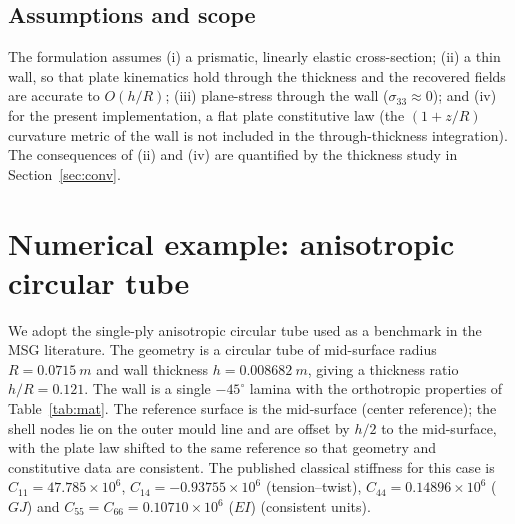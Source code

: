 \documentclass[preprint,12pt]{elsarticle}
\newcommand{\hR}{h/R}
\begin{document}
\subsection{Assumptions and scope}
The formulation assumes (i) a prismatic, linearly elastic cross-section;
(ii) a thin wall, so that plate kinematics hold through the thickness and the
recovered fields are accurate to $O(\hR)$; (iii) plane-stress through the wall
($\sigma_{33}\!\approx\!0$); and (iv) for the present implementation, a flat
plate constitutive law (the $(1+z/R)$ curvature metric of the wall is not
included in the through-thickness integration). The consequences of (ii) and
(iv) are quantified by the thickness study in Section~\ref{sec:conv}.

\section{Numerical example: anisotropic circular tube}
We adopt the single-ply anisotropic circular tube used as a benchmark in the
MSG literature. The geometry is a circular tube of mid-surface radius
$R=\SI{0.0715}{m}$ and wall thickness $h=\SI{0.008682}{m}$, giving a thickness
ratio $\hR=0.121$. The wall is a single $-45^{\circ}$ lamina with the
orthotropic properties of Table~\ref{tab:mat}. The reference surface is the
mid-surface (center reference); the shell nodes lie on the outer mould line and
are offset by $h/2$ to the mid-surface, with the plate law shifted to the same
reference so that geometry and constitutive data are consistent. The published
classical stiffness for this case is $C_{11}=47.785\times10^{6}$,
$C_{14}=-0.93755\times10^{6}$ (tension--twist), $C_{44}=0.14896\times10^{6}$
($GJ$) and $C_{55}=C_{66}=0.10710\times10^{6}$ ($EI$) (consistent units).

\begin{table}[t]\centering
\caption{Lamina properties of the anisotropic tube.}
\label{tab:mat}
\end{table}
\end{document}
